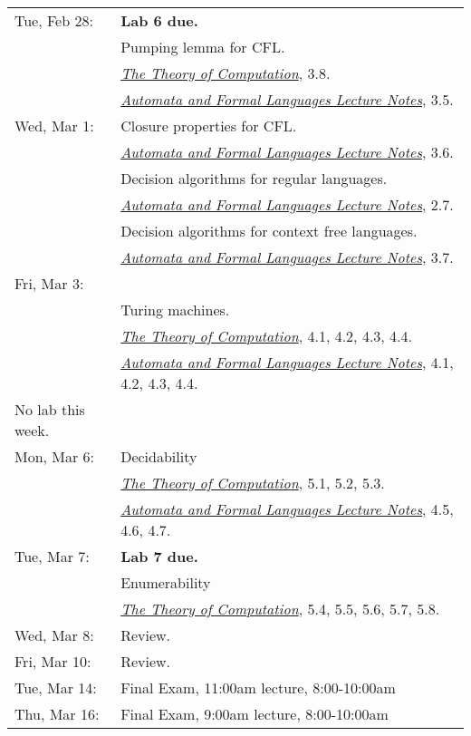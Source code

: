 \documentclass{article}
\newcommand{\theory}
           {\href{http://cg.scs.carleton.ca/~michiel/TheoryOfComputation/}
             {{\em The Theory of Computation}}}
\newcommand{\automata}
           {\href{http://users.utu.fi/jkari/automata/}
             {{\em Automata and Formal Languages Lecture Notes}}}
\begin{document}
\begin{longtable}{ll}
Tue, Feb 28:
& {\bf Lab 6 due.}
\\& Pumping lemma for CFL.  \\&\theory, 3.8.  \\&\automata, 3.5.
\\
Wed, Mar 1:
& Closure properties for CFL. \\&\automata, 3.6.
\\& Decision algorithms for regular languages. \\&\automata, 2.7.
\\& Decision algorithms for context free languages. \\&\automata, 3.7.
\\
Fri, Mar 3:
\\& Turing machines.
\\& \theory, 4.1, 4.2, 4.3, 4.4.
\\& \automata, 4.1, 4.2, 4.3, 4.4.
\\\hline
No lab this week.
\\
Mon, Mar 6:
& Decidability
\\& \theory, 5.1, 5.2, 5.3.
\\& \automata, 4.5, 4.6, 4.7.
\\
Tue, Mar 7:
& {\bf Lab 7 due.}
\\& Enumerability
\\&\theory, 5.4, 5.5, 5.6, 5.7, 5.8.
\\
Wed, Mar 8:&  Review.
\\
Fri, Mar 10: & Review.
\\\hline
Tue, Mar 14: &  Final Exam, 11:00am lecture, 8:00-10:00am
\\
Thu, Mar 16: &  Final Exam, 9:00am lecture, 8:00-10:00am
\end{longtable}
\end{document}
